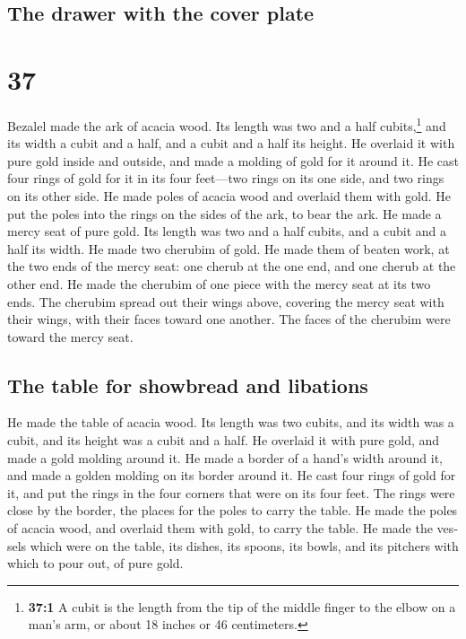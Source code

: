 \begin{paracol}{2}
\switchcolumn
\begin{otherlanguage}{english}

\hypertarget{the-drawer-with-the-cover-plate}{%
\subsection{The drawer with the cover
plate}\label{the-drawer-with-the-cover-plate}}

\hypertarget{section-73}{%
\section{37}\label{section-73}}

 Bezalel made the ark of acacia wood. Its length was two
and a half cubits,\footnote{\textbf{37:1} A cubit is the length from the
  tip of the middle finger to the elbow on a man's arm, or about 18
  inches or 46 centimeters.} and its width a cubit and a half, and a
cubit and a half its height.  He overlaid it with pure
gold inside and outside, and made a molding of gold for it around it.
 He cast four rings of gold for it in its four feet---two
rings on its one side, and two rings on its other side. 
He made poles of acacia wood and overlaid them with gold. 
He put the poles into the rings on the sides of the ark, to bear the
ark.  He made a mercy seat of pure gold. Its length was
two and a half cubits, and a cubit and a half its width. 
He made two cherubim of gold. He made them of beaten work, at the two
ends of the mercy seat:  one cherub at the one end, and
one cherub at the other end. He made the cherubim of one piece with the
mercy seat at its two ends.  The cherubim spread out their
wings above, covering the mercy seat with their wings, with their faces
toward one another. The faces of the cherubim were toward the mercy
seat.

\hypertarget{the-table-for-showbread-and-libations}{%
\subsection{The table for showbread and
libations}\label{the-table-for-showbread-and-libations}}

 He made the table of acacia wood. Its length was two
cubits, and its width was a cubit, and its height was a cubit and a
half.  He overlaid it with pure gold, and made a gold
molding around it.  He made a border of a hand's width
around it, and made a golden molding on its border around it.
 He cast four rings of gold for it, and put the rings in
the four corners that were on its four feet.  The rings
were close by the border, the places for the poles to carry the table.
 He made the poles of acacia wood, and overlaid them with
gold, to carry the table.  He made the vessels which were
on the table, its dishes, its spoons, its bowls, and its pitchers with
which to pour out, of pure gold.


\end{otherlanguage}
\end{paracol}
